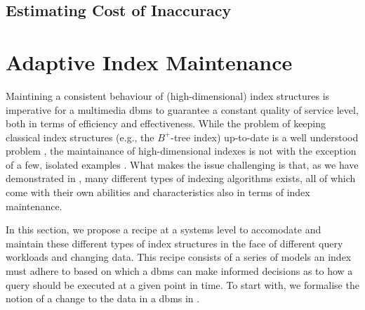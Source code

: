 \subsection{Estimating Cost of Inaccuracy}
\label{section:inaccuracy_cost_estimation}

\section{Adaptive Index Maintenance}

Maintining a consistent behaviour of (high-dimensional) index structures is imperative for a multimedia \acrshort{dbms} to guarantee a constant quality of service level, both in terms of efficiency and effectiveness. While the problem of keeping classical index structures (e.g., the $B^{+}$-tree index) up-to-date is a well understood problem \cite{Garcia:2009Database,Petrov:2019Database}, the maintainance of high-dimensional indexes is not with the exception of a few, isolated examples \cite{Olafsson:2011Dynamic,Hojsgaard:2019Index}. What makes the issue challenging is that, as we have demonstrated in , many different types of indexing algorithms exists, all of which come with their own abilities and characteristics also in terms of index maintenance. 

In this section, we propose a recipe at a systems level to accomodate and maintain these different types of index structures in the face of different query workloads and changing data. This recipe consists of a series of models an index must adhere to based on which a \acrshort{dbms} can make informed decisions as to how a query should be executed at a given point in time. To start with, we formalise the notion of a change to the data in a \acrshort{dbms} in .

